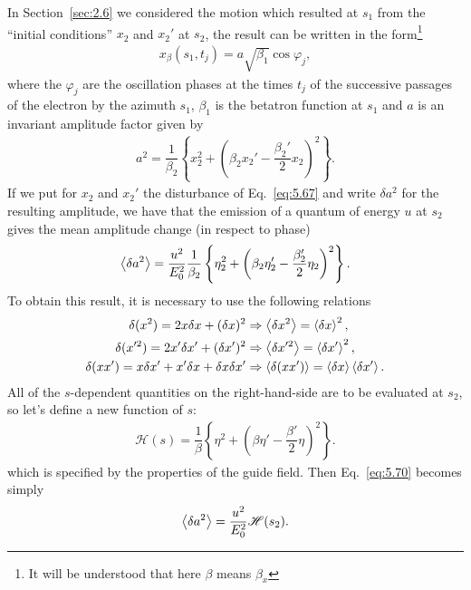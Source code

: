 In Section~\ref{sec:2.6} we considered the motion which resulted at $s_1$ from the ``initial
conditions'' $x_2$ and $x_2'$ at $s_2$, the result can be written in the form\footnote{It will be understood that here $\beta$ means $\beta_x$}
\begin{align} \label{eq:5.68}
	x_\beta(s_1,t_j) = a \sqrt{\beta_1} \cos \varphi_j,
\end{align}
where the $\varphi_j$ are the oscillation phases at the times $t_j$ of the successive passages
of the electron by the azimuth $s_1$, $\beta_1$ is the betatron function at $s_1$ and $a$ is an
invariant amplitude factor given by
\begin{align}
	a^2 = \dfrac{1}{\beta_2} \left\lbrace x_2^2 + \left( \beta_2 x_2' - \dfrac{\beta_2'}{2} x_2 \right)^2 \right\rbrace.
\end{align}
If we put for $x_2$ and $x_2'$ the disturbance of Eq.~\eqref{eq:5.67} and write $\delta a^2$ for the resulting amplitude, we have that the emission of a quantum of energy $u$ at $s_2$ gives the
mean amplitude change (in respect to phase)
\begin{align} \label{eq:5.70}
	\left< \delta a^2 \right> = \dfrac{u^2}{E_0^2} \dfrac{1}{\beta_2} \left\lbrace \eta_2^2 + \left( \beta_2 \eta_2' - \dfrac{\beta_2'}{2} \eta_2 \right)^2 \right\rbrace.
\end{align}
To obtain this result, it is necessary to use the following relations
\begin{align*}
	\delta(x^2) = 2 x \delta x + (\delta x)^2 & \Rightarrow \left< \delta x^2 \right> = \left< \delta x \right>^2,\\
    \delta(x'^2) = 2 x' \delta x' + (\delta x')^2 & \Rightarrow \left< \delta x'^2 \right> = \left< \delta x' \right>^2,\\
    \delta(x x') = x \delta x' + x' \delta x + \delta x \delta x' & \Rightarrow \left< \delta (x x') \right> = \left< \delta x \right> \left< \delta x' \right>.
\end{align*}
All of the $s$-dependent quantities on the right-hand-side are to be evaluated at $s_2$, so let's define a new function of $s$:
\begin{align} \label{eq:5.71}
	\mathscr{H}(s) = \dfrac{1}{\beta} \left\lbrace \eta^2 + \left( \beta \eta' - \dfrac{\beta'}{2} \eta \right)^2 \right\rbrace.
\end{align}
which is specified by the properties of the guide field. Then Eq.~\eqref{eq:5.70} becomes
simply
\begin{align} \label{eq:5.73}
	\left< \delta a^2 \right> = \dfrac{u^2}{E_0^2} \mathscr{H}(s_2).
\end{align}
